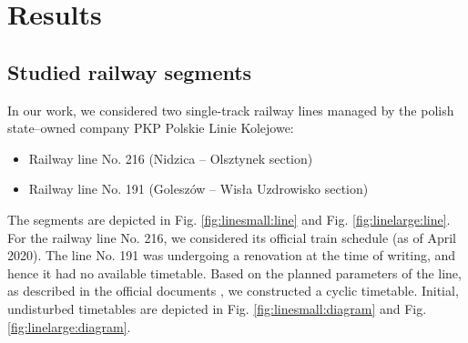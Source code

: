   \section{Results}

\subsection{Studied railway segments}
In our work, we considered two single-track railway lines managed by the polish
state--owned company PKP Polskie Linie Kolejowe:

\begin{itemize}
  \item Railway line No. 216 (Nidzica -- Olsztynek section)
  \item Railway line No. 191 (Goleszów -- Wisła Uzdrowisko section)
\end{itemize}

The segments are depicted in Fig. \ref{fig:linesmall:line} and Fig. \ref{fig:linelarge:line}.
For the railway line No. 216, we considered its official train schedule (as of
April 2020). The line No. 191 was undergoing a renovation at the time of
writing, and hence it had no available timetable. Based on the planned
parameters of the line, as described in the official documents \cite{PKPPLK},
we constructed a cyclic timetable. Initial, undisturbed timetables are depicted
in Fig. \ref{fig:linesmall:diagram} and Fig. \ref{fig:linelarge:diagram}.

